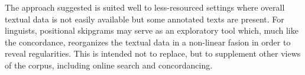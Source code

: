 \documentclass[12pt]{article}
\begin{document}

The approach suggested is suited well to less-resourced settings
where overall textual data is not easily available but some annotated
texts are present. For linguists, positional skipgrams may serve as an
exploratory tool which, much like the concordance, reorganizes the
textual data in a non-linear fasion in order to reveal
regularities. This is intended not to replace, but to supplement other
views of the corpus, including online search and concordancing.


\printbibliography{}
\end{document}

